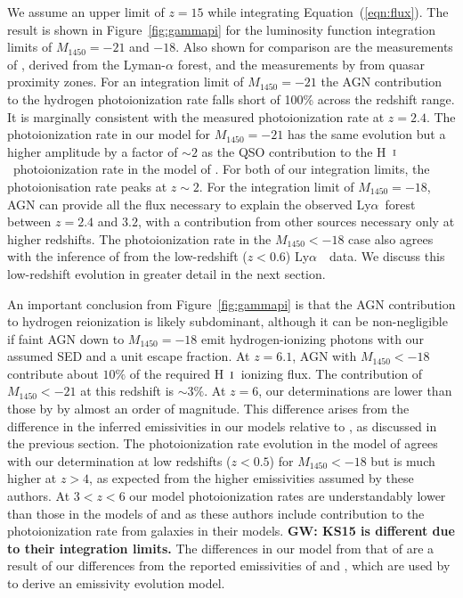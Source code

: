 \documentclass[fleqn,usenatbib]{mnras}
\def\lya{Ly$\alpha$~}
\def\HI{\hbox{H~$\scriptstyle\rm I$}}
\begin{document}
We assume an
upper limit of $z=15$ while integrating Equation~(\ref{eqn:flux}).
The result is shown in Figure~\ref{fig:gammapi} for the luminosity
function integration limits of $M_{1450}=-21$ and $-18$.  Also shown
for comparison are the measurements of \citet{2013MNRAS.436.1023B},
derived from the Lyman-$\alpha$ forest, and the measurements by
\citet{2011MNRAS.412.2543C} from quasar proximity zones.
For an
integration limit of $M_{1450}=-21$ the AGN contribution to the
hydrogen photoionization rate falls short of 100\% across the redshift
range.  It is marginally consistent with the measured photoionization
rate at $z=2.4$.  The photoionization rate in our model for
$M_{1450}=-21$ has the same evolution but a higher amplitude by a
factor of $\sim 2$ as the QSO contribution to the \HI\ photoionization
rate in the model of \citet{2012ApJ...746..125H}.  For both of our
integration limits, the photoionisation rate peaks at $z\sim 2$.  For
the integration limit of $M_{1450}=-18$, AGN can provide all the flux
necessary to explain the observed \lya forest between $z=2.4$ and
$3.2$, with a contribution from other sources necessary only at higher
redshifts.  The photoionization rate in the $M_{1450}<-18$ case also
agrees with the inference of \citet{2017MNRAS.467.3172G} from the
low-redshift ($z<0.6$) \lya\ data.  We discuss this low-redshift
evolution in greater detail in the next section.

An important conclusion from Figure~\ref{fig:gammapi} is that the AGN
contribution to hydrogen reionization is likely subdominant, although
it can be non-negligible if faint AGN down to $M_{1450}=-18$ emit
hydrogen-ionizing photons with our assumed SED and a unit escape
fraction.  At $z=6.1$, AGN with $M_{1450}<-18$ contribute about $10\%$
of the required \HI\ ionizing flux.  The contribution of
$M_{1450}<-21$ at this redshift is $\sim 3\%$.  At $z=6$, our
determinations are lower than those by \citet{2015AA...578A..83G} by
almost an order of magnitude.  This difference arises from the
difference in the inferred emissivities in our models relative to
\citet{2015AA...578A..83G}, as discussed in the previous section.  The
photoionization rate evolution in the model of
\citet{2015ApJ...813L...8M} agrees with our determination at low
redshifts ($z<0.5$) for $M_{1450}<-18$ but is much higher at $z>4$, as
expected from the higher emissivities assumed by these authors.  At
$3<z<6$ our model photoionization rates are understandably lower than
those in the models of \citet{2017ApJ...837..106O} and
\citet{2018arXiv180104931P} as these authors include contribution to
the photoionization rate from galaxies in their models.
\textbf{GW: KS15 is different due to their integration limits.}
The differences in our model from that of \citet{2015MNRAS.451L..30K} are
a result of our differences from the reported emissivities of
\citet{2009MNRAS.392...19C} and \citet{2013A&A...551A..29P}, which are
used by \citet{2015MNRAS.451L..30K} to derive an emissivity evolution
model.
\end{document}
